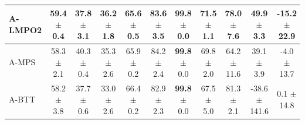 \begin{table}[t]
\begin{tabular}{lcccccccccc}
\shortstack[l]{A-LMPO2 \\ {}} & \shortstack{59.4 \\ $\pm$ 0.4} & \shortstack{37.8 \\ $\pm$ 3.1} & \shortstack{36.2 \\ $\pm$ 1.8} & \shortstack{65.6 \\ $\pm$ 0.5} & \shortstack{83.6 \\ $\pm$ 3.5} & \shortstack{\textbf{99.8} \\ $\pm$ 0.0} & \shortstack{71.5 \\ $\pm$ 1.1} & \shortstack{78.0 \\ $\pm$ 7.6} & \shortstack{49.9 \\ $\pm$ 3.3} & \shortstack{-15.2 \\ $\pm$ 22.9} \\
\midrule
\shortstack[l]{A-MPS \\ {}} & \shortstack{58.3 \\ $\pm$ 2.1} & \shortstack{40.3 \\ $\pm$ 0.4} & \shortstack{35.3 \\ $\pm$ 2.6} & \shortstack{65.9 \\ $\pm$ 0.2} & \shortstack{84.2 \\ $\pm$ 2.4} & \shortstack{\textbf{99.8} \\ $\pm$ 0.0} & \shortstack{69.8 \\ $\pm$ 2.0} & \shortstack{64.2 \\ $\pm$ 11.6} & \shortstack{39.1 \\ $\pm$ 3.9} & \shortstack{-4.0 \\ $\pm$ 13.7} \\
\midrule
\shortstack[l]{A-BTT \\ {}} & \shortstack{58.2 \\ $\pm$ 3.8} & \shortstack{37.7 \\ $\pm$ 0.6} & \shortstack{33.0 \\ $\pm$ 2.6} & \shortstack{66.4 \\ $\pm$ 0.2} & \shortstack{82.9 \\ $\pm$ 2.3} & \shortstack{\textbf{99.8} \\ $\pm$ 0.0} & \shortstack{67.5 \\ $\pm$ 5.0} & \shortstack{81.3 \\ $\pm$ 2.1} & \shortstack{-38.6 \\ $\pm$ 141.6} & \shortstack{0.1 \\ $\pm$ 14.8} \\
\midrule

\end{tabular}
\end{table}
